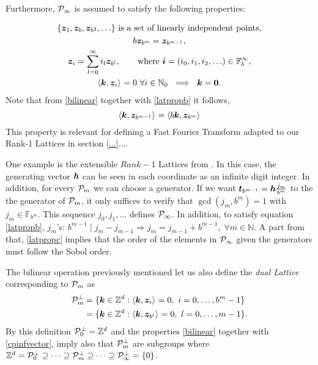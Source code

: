 \documentclass[graybox,footinfo]{svmult}
\newcommand{\Z}{\mathbb{Z}} %
\newcommand{\N}{\mathbb{N}} %
\newcommand{\F}{\mathbb{F}} %
\newcommand{\bszero}{\boldsymbol{0}} %
\newcommand{\bst}{\boldsymbol{t}}    %
\newcommand{\bsz}{\boldsymbol{z}}    %
\begin{document}
Furthermore, $\mathcal{P}_\infty$ is assumed to satisfy the following properties:

\begin{subequations} \label{cpinfvector}
\begin{gather}
\{\bsz_{1}, \bsz_{b}, \bsz_{b^2}, \ldots\} \text{ is a set of linearly independent points}, \\
b\bsz_{b^m}=\bsz_{b^{m-1}},\label{latpropb}\\
\bsz_i = \sum_{l=0}^{\infty} i_l \bsz_{b^l}, \qquad \text{where }\bsi=(i_0, i_1, i_2, \ldots ) \in \F_b^\infty, \label{latpropc}\\
\ip{\bsk}{\bsz_i} =  0 \ \forall i \in \N_0   \ \implies \ \bsk=\bszero. \label{latpropd}
\end{gather}
\end{subequations}
Note that from \eqref{bilinear} together with \eqref{latpropb} it follows,
\begin{equation}\label{assumgenip}
\ip{\bsk}{\bsz_{b^{m-1}}}=\ip{b\bsk}{\bsz_{b^m}}
\end{equation}
This property is relevant for defining a Fast Fourier Transform adapted to our Rank-1 Lattices in section \ref{...}....

One example is the extensible $Rank-1$ Lattices from \cite{HicNie03a}. In this case, the generating vector $\boldsymbol{h}$ can be seen in each coordinate as an infinite digit integer. In addition, for every $\mathcal{P}_m$ we can choose a generator. If we want $\bst_{b^{m-1}}=\bsh\frac{j_m}{b^m}$ to the the generator of $\mathcal{P}_m$, it only suffices to verify that $\gcd(j_m,b^m)=1$ with $j_m\in\F_{b^m}$. This sequence $j_0,j_1,\dots$ defines $\mathcal{P}_\infty$. In addition, to satisfy equation \eqref{latpropb},  $j_m$'s: $ b^{m-1} \mid j_m-j_{m-1}\Rightarrow j_m=j_{m-1}+b^{m-1},\;\forall m\in\N$. A part from that, \eqref{latpropc} implies that the order of the elements in $\mathcal{P}_\infty$ given the generators must follow the Sobol order.

The bilinear operation previously mentioned let us also define the \emph{dual Lattice} corresponding to $\mathcal{P}_m$ as
\begin{align*}
\cp^{\perp}_m &= \{\bsk \in \Z^d : \ip{\bsk}{\bsz_i} = 0, \ i=0, \ldots, b^m-1\} \\
&= \{\bsk \in \Z^d : \ip{\bsk}{\bsz_{b^{l}}} = 0, \ l=0, \ldots, m-1\}.
\end{align*}
By this definition $\cp^{\perp}_{0}=\Z^d$ and the properties \eqref{bilinear} together with \eqref{cpinfvector}, imply also that $\mathcal{P}^{\perp}_m$ are subgroups where $\Z^d=\cp^{\perp}_{0}\supseteq\dots\supseteq\cp^{\perp}_{m}\supseteq\dots\supseteq\cp^{\perp}_{\infty}=\{0\}$.
\end{document}
